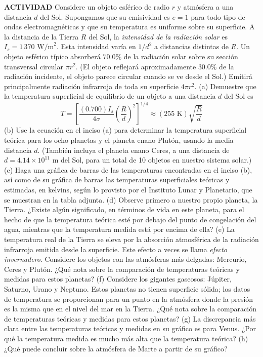 \item \textbf{ACTIVIDAD} Considere un objeto esférico de radio $r$ y atmósfera a una distancia $d$ del Sol. Supongamos que su emisividad es $e = 1$ para todo tipo de ondas electromagnéticas y que su temperatura es uniforme sobre su superficie. A la distancia de la Tierra $R$ del Sol, la \textit{intensidad de la radiación solar} es $I_s = 1\,370 \text{ W/m}^2$. Esta intensidad varía en $1/d^2$ a distancias distintas de $R$. Un objeto esférico típico absorberá $70.0\%$ de la radiación solar sobre su sección transversal circular $\pi r^2$. (El objeto reflejará aproximadamente $30.0\%$ de la radiación incidente, el objeto parece circular cuando se ve desde el Sol.) Emitirá principalmente radiación infrarroja de toda su superficie $4\pi r^2$. 
(a) Demuestre que la temperatura superficial de equilibrio de un objeto a una distancia $d$ del Sol es
$$ T = \left[ \frac{(0.700)I_s}{4\sigma} \left(\frac{R}{d}\right)^2 \right]^{1/4} \approx (255 \text{ K}) \sqrt{\frac{R}{d}} $$
(b) Use la ecuación en el inciso (a) para determinar la temperatura superficial teórica para los ocho planetas y el planeta enano Plutón, usando la media distancia $d$. (También incluya el planeta enano Ceres, a una distancia de $d = 4.14 \times 10^{11} \text{ m}$ del Sol, para un total de 10 objetos en nuestro sistema solar.) 
(c) Haga una gráfica de barras de las temperaturas encontradas en el inciso (b), así como de su gráfica de barras las temperaturas superficiales teóricas y estimadas, en kelvins, según lo provisto por el Instituto Lunar y Planetario, que se muestran en la tabla adjunta. 
(d) Observe primero a nuestro propio planeta, la Tierra. ¿Existe algún significado, en términos de vida en este planeta, para el hecho de que la temperatura teórica esté por debajo del punto de congelación del agua, mientras que la temperatura medida está por encima de ella? 
(e) La temperatura real de la Tierra se eleva por la absorción atmosférica de la radiación infrarroja emitida desde la superficie. Este efecto a veces se llama \textit{efecto invernadero}. Considere los objetos con las atmósferas más delgadas: Mercurio, Ceres y Plutón. ¿Qué nota sobre la comparación de temperaturas teóricas y medidas para estos planetas? 
(f) Considere los gigantes gaseosos: Júpiter, Saturno, Urano y Neptuno. Estos planetas no tienen superficie sólida; los datos de temperatura se proporcionan para un punto en la atmósfera donde la presión es la misma que en el nivel del mar en la Tierra. ¿Qué nota sobre la comparación de temperaturas teóricas y medidas para estos planetas? 
(g) La discrepancia más clara entre las temperaturas teóricas y medidas en su gráfico es para Venus. ¿Por qué la temperatura medida es mucho más alta que la temperatura teórica? 
(h) ¿Qué puede concluir sobre la atmósfera de Marte a partir de su gráfico?
